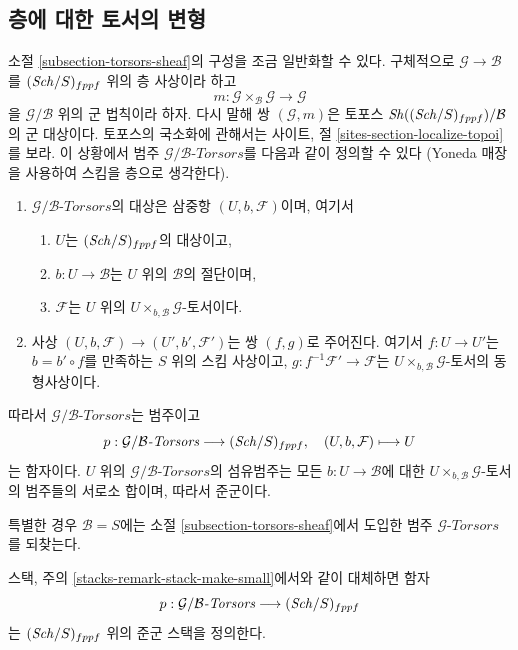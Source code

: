 \subsection{층에 대한 토서의 변형}
\label{subsection-variant-torsor-sheaf}

\noindent
소절 \ref{subsection-torsors-sheaf}의 구성을 조금 일반화할 수 있다.
구체적으로 $\mathcal{G} \to \mathcal{B}$를 $(\mathit{Sch}/S)_{fppf}$ 위의 층
사상이라 하고
$$
m :
\mathcal{G} \times_\mathcal{B} \mathcal{G}
\longrightarrow
\mathcal{G}
$$
을 $\mathcal{G}/\mathcal{B}$ 위의 군 법칙이라 하자. 다시 말해 쌍
$(\mathcal{G}, m)$은 토포스 $\mathop{\mathit{Sh}}\nolimits((\mathit{Sch}/S)_{fppf})/\mathcal{B}$의
군 대상이다. 토포스의 국소화에 관해서는 사이트, 절
\ref{sites-section-localize-topoi}를 보라. 이 상황에서 범주
$\mathcal{G}/\mathcal{B}\textit{-Torsors}$를 다음과 같이 정의할 수 있다
(Yoneda 매장을 사용하여 스킴을 층으로 생각한다).
\begin{enumerate}
\item $\mathcal{G}/\mathcal{B}\textit{-Torsors}$의 대상은 삼중항
$(U, b, \mathcal{F})$이며, 여기서
\begin{enumerate}
\item $U$는 $(\mathit{Sch}/S)_{fppf}$의 대상이고,
\item $b : U \to \mathcal{B}$는 $U$ 위의 $\mathcal{B}$의 절단이며,
\item $\mathcal{F}$는 $U$ 위의
$U \times_{b, \mathcal{B}}\mathcal{G}$-토서이다.
\end{enumerate}
\item 사상 $(U, b, \mathcal{F}) \to (U', b', \mathcal{F}')$는 쌍
$(f, g)$로 주어진다. 여기서 $f : U \to U'$는 $b = b' \circ f$를
만족하는 $S$ 위의 스킴 사상이고, $g : f^{-1}\mathcal{F}' \to \mathcal{F}$는
$U \times_{b, \mathcal{B}} \mathcal{G}$-토서의 동형사상이다.
\end{enumerate}
따라서 $\mathcal{G}/\mathcal{B}\textit{-Torsors}$는 범주이고
$$
p :
\mathcal{G}/\mathcal{B}\textit{-Torsors}
\longrightarrow
(\mathit{Sch}/S)_{fppf},
\quad
(U, b, \mathcal{F}) \longmapsto U
$$
는 함자이다. $U$ 위의 $\mathcal{G}/\mathcal{B}\textit{-Torsors}$의
섬유범주는 모든 $b : U \to \mathcal{B}$에 대한
$U \times_{b, \mathcal{B}} \mathcal{G}$-토서의 범주들의 서로소 합이며,
따라서 준군이다.

\medskip\noindent
특별한 경우 $\mathcal{B} = S$에는 소절
\ref{subsection-torsors-sheaf}에서 도입한 범주
$\mathcal{G}\textit{-Torsors}$를 되찾는다.

\begin{lemma}
\label{lemma-variant-torsors-sheaf-stack-in-groupoids}
스택, 주의 \ref{stacks-remark-stack-make-small}에서와 같이 대체하면 함자
$$
p :
\mathcal{G}/\mathcal{B}\textit{-Torsors}
\longrightarrow
(\mathit{Sch}/S)_{fppf}
$$
는 $(\mathit{Sch}/S)_{fppf}$ 위의 준군 스택을 정의한다.
\end{lemma}

